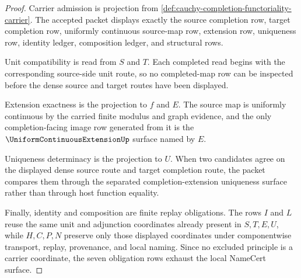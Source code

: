\begin{proof}
Carrier admission is projection from \autoref{def:cauchy-completion-functoriality-carrier}. The accepted packet displays exactly the source completion row, target completion row, uniformly continuous source-map row, extension row, uniqueness row, identity ledger, composition ledger, and structural rows.

Unit compatibility is read from $S$ and $T$. Each completed read begins with the corresponding source-side unit route, so no completed-map row can be inspected before the dense source and target routes have been displayed.

Extension exactness is the projection to $f$ and $E$. The source map is uniformly continuous by the carried finite modulus and graph evidence, and the only completion-facing image row generated from it is the $\UniformContinuousExtensionUp$ surface named by $E$.

Uniqueness determinacy is the projection to $U$. When two candidates agree on the displayed dense source route and target completion route, the packet compares them through the separated completion-extension uniqueness surface rather than through host function equality.

Finally, identity and composition are finite replay obligations. The rows $I$ and $L$ reuse the same unit and adjunction coordinates already present in $S,T,E,U$, while $H,C,P,N$ preserve only those displayed coordinates under componentwise transport, replay, provenance, and local naming. Since no excluded principle is a carrier coordinate, the seven obligation rows exhaust the local NameCert surface.
\end{proof}


